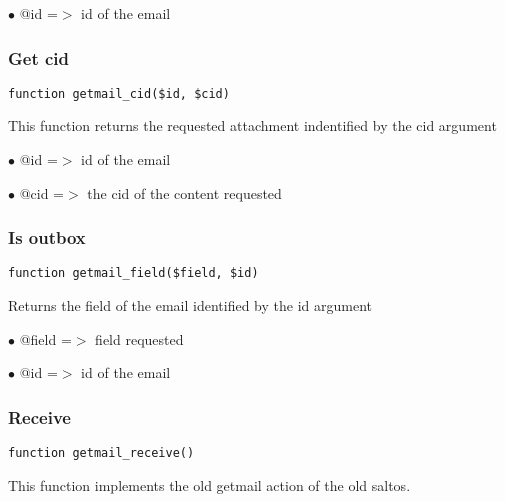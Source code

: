 \documentclass[a4paper]{article}
\begin{document}
\begin{compactitem}
\item[\color{myblue}$\bullet$] @id =$>$ id of the email
\end{compactitem}

\hypertarget{toc58}{}
\subsubsection{Get cid}

\begin{lstlisting}
function getmail_cid($id, $cid)
\end{lstlisting}

This function returns the requested attachment indentified by the cid argument

\begin{compactitem}
\item[\color{myblue}$\bullet$] @id  =$>$ id of the email
\item[\color{myblue}$\bullet$] @cid =$>$ the cid of the content requested
\end{compactitem}

\hypertarget{toc59}{}
\subsubsection{Is outbox}

\begin{lstlisting}
function getmail_field($field, $id)
\end{lstlisting}

Returns the field of the email identified by the id argument

\begin{compactitem}
\item[\color{myblue}$\bullet$] @field =$>$ field requested
\item[\color{myblue}$\bullet$] @id    =$>$ id of the email
\end{compactitem}

\hypertarget{toc60}{}
\subsubsection{Receive}

\begin{lstlisting}
function getmail_receive()
\end{lstlisting}

This function implements the old getmail action of the old saltos.
\end{document}
